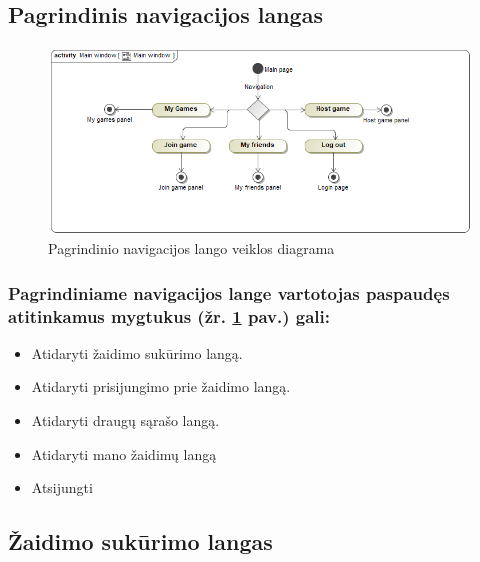 \documentclass{VUMIFPSkursinis}
\begin{document}
	\subsection{Pagrindinis navigacijos langas}
		\begin{figure}[H]
			\centering
			\includegraphics[scale=0.5]{img/MainWindow_activity}
			\caption{Pagrindinio navigacijos lango veiklos diagrama}
			\label{img:MainWindow_activity}
		\end{figure}
		\subsubsection*{Pagrindiniame navigacijos lange vartotojas paspaudęs atitinkamus mygtukus (žr. \ref{img:MainWindow_activity} pav.) gali:}
			\renewcommand{\labelitemi}{$\bullet$}
			\begin{itemize}
				\item Atidaryti žaidimo sukūrimo langą.
				\item Atidaryti prisijungimo prie žaidimo langą.
				\item Atidaryti draugų sąrašo langą.
				\item Atidaryti mano žaidimų langą
				\item Atsijungti
			\end{itemize}

	\subsection{Žaidimo sukūrimo langas}
\end{document}
